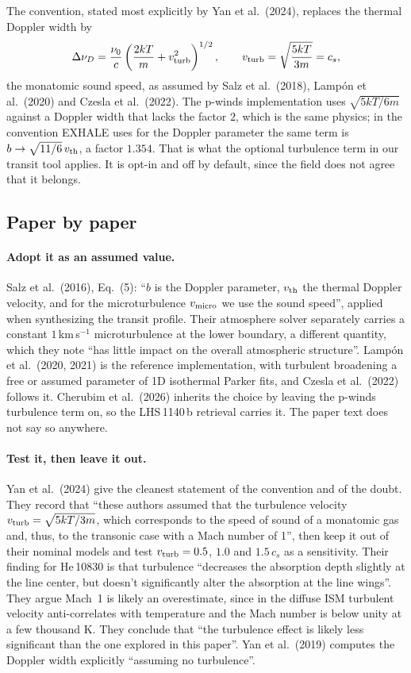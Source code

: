 \documentclass[english,a4paper]{my_memo}
\begin{document}
The convention, stated most explicitly by Yan et al.\ (2024), replaces the
thermal Doppler width by
\begin{equation}
  \Delta\nu_D = \frac{\nu_0}{c}\left(\frac{2kT}{m} + v_{\rm turb}^2\right)^{1/2},
  \qquad v_{\rm turb} = \sqrt{\frac{5kT}{3m}} = c_s ,
\end{equation}
the monatomic sound speed, as assumed by Salz et al.\ (2018), Lamp\'on et
al.\ (2020) and Czesla et al.\ (2022). The p-winds implementation uses
$\sqrt{5kT/6m}$ against a Doppler width that lacks the factor $2$, which is
the same physics; in the convention EXHALE uses for the Doppler parameter the
same term is $b \to \sqrt{11/6}\,v_{\rm th}$, a factor $1.354$. That is what
the optional turbulence term in our transit tool applies. It is opt-in and
off by default, since the field does not agree that it belongs.

\subsection{Paper by paper}
\label{sec:lit}

\paragraph{Adopt it as an assumed value.}
Salz et al.\ (2016), Eq.~(5): ``$b$ is the Doppler parameter,
$v_{\rm th}$ the thermal Doppler velocity, and for the microturbulence
$v_{\rm micro}$ we use the sound speed'', applied when synthesizing the
transit profile. Their atmosphere solver separately carries a constant
$1$\,km\,s$^{-1}$ microturbulence at the lower boundary, a different
quantity, which they note ``has little impact on the overall atmospheric
structure''. Lamp\'on et al.\ (2020, 2021) is the reference implementation,
with turbulent broadening a free or assumed parameter of 1D isothermal Parker
fits, and Czesla et al.\ (2022) follows it. Cherubim et al.\ (2026) inherits
the choice by leaving the p-winds turbulence term on, so the LHS\,1140\,b
retrieval carries it. The paper text does not say so anywhere.

\paragraph{Test it, then leave it out.}
Yan et al.\ (2024) give the cleanest statement of the convention and of the
doubt. They record that ``these authors assumed that the turbulence velocity
$v_{\rm turb} = \sqrt{5kT/3m}$, which corresponds to the speed of sound of a
monatomic gas and, thus, to the transonic case with a Mach number of 1'',
then keep it out of their nominal models and test $v_{\rm turb} = 0.5$, $1.0$
and $1.5\,c_s$ as a sensitivity. Their finding for He\,10830 is that
turbulence ``decreases the absorption depth slightly at the line center, but
doesn't significantly alter the absorption at the line wings''. They argue
Mach~1 is likely an overestimate, since in the diffuse ISM turbulent velocity
anti-correlates with temperature and the Mach number is below unity at a few
thousand K. They conclude that ``the turbulence effect is likely less
significant than the one explored in this paper''. Yan et al.\ (2019)
computes the Doppler width explicitly ``assuming no turbulence''.
\end{document}
